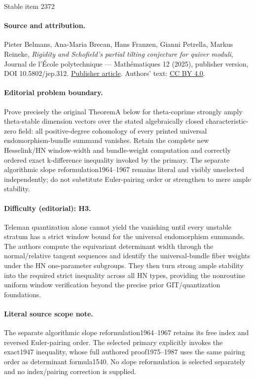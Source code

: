 \documentclass[11pt]{article}
\theoremstyle{plain}
\theoremstyle{definition}
\begin{document}
\begin{center}{\Large Stable item 2372}\end{center}
\paragraph{Source and attribution.}
Pieter Belmans, Ana-Maria Brecan, Hans Franzen, Gianni Petrella, Markus Reineke, \emph{Rigidity and Schofield’s partial tilting conjecture for quiver moduli}, Journal de l’École polytechnique — Mathématiques 12 (2025), publisher version, DOI 10.5802/jep.312. \href{https://jep.centre-mersenne.org/articles/10.5802/jep.312/}{Publisher article}. Authors' text: \href{https://creativecommons.org/licenses/by/4.0/}{CC BY 4.0}.
\paragraph{Editorial problem boundary.}
Prove precisely the original TheoremA below for theta-coprime strongly amply theta-stable dimension vectors over the stated algebraically closed characteristic-zero field: all positive-degree cohomology of every printed universal endomorphism-bundle summand vanishes. Retain the complete new Hesselink/HN window-width and bundle-weight computation and correctly ordered exact k-difference inequality invoked by the primary. The separate algorithmic slope reformulation1964–1967 remains literal and visibly unselected independently; do not substitute Euler-pairing order or strengthen to mere ample stability.
\paragraph{Difficulty (editorial): H3.}
Teleman quantization alone cannot yield the vanishing until every unstable stratum has a strict window bound for the universal endomorphism summands. The authors compute the equivariant determinant width through the normal/relative tangent sequences and identify the universal-bundle fiber weights under the HN one-parameter subgroups. They then turn strong ample stability into the required strict inequality across all HN types, providing the nonroutine uniform window verification beyond the precise prior GIT/quantization foundations.
\paragraph{Literal source scope note.}
The separate algorithmic slope reformulation1964–1967 retains its free index and reversed Euler-pairing order. The selected primary explicitly invokes the exact1947 inequality, whose full authored proof1975–1987 uses the same pairing order as determinant formula1540. No slope reformulation is selected separately and no index/pairing correction is supplied.
\end{document}
